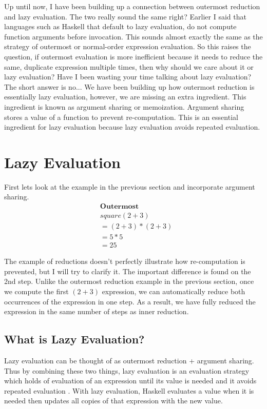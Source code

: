 \documentclass{article}
\begin{document}
\medskip\noindent
Up until now, I have been building up a connection between outermost reduction and lazy evaluation. The two really sound the same right? Earlier I said that languages such as Haskell that default to lazy evaluation, do not compute function arguments before invocation. This sounds almost exactly the same as the strategy of outermost or normal-order expression evaluation. So this raises the question, if outermost evaluation is more inefficient because it needs to reduce the same, duplicate expression multiple times, then why should we care about it or lazy evaluation? Have I been wasting your time talking about lazy evaluation? The short answer is no... We have been building up how outermost reduction is essentially lazy evaluation, however, we are missing an extra ingredient. This ingredient is known as argument sharing or memoization. Argument sharing stores a value of a function to prevent re-computation. This is an essential ingredient for lazy evaluation because lazy evaluation avoids repeated evaluation. 



\section{Lazy Evaluation}

First lets look at the example in the previous section and incorporate argument sharing. \noindent\begin{align*}
&\textbf{Outermost}  \\
&square (2+3)  \\
&=(2+3)*(2+3) \\
&=5 * 5   \\
&=25   
\end{align*}

\medskip\noindent
The example of reductions doesn't perfectly illustrate how re-computation is prevented, but I will try to clarify it. The important difference is found on the 2nd step. Unlike the outermost reduction example in the previous section, once we compute the first $(2+3)$ expression, we can automatically reduce both occurrences of the expression in one step. As a result, we have fully reduced the expression in the same number of steps as inner reduction.

\subsection{What is Lazy Evaluation?}

\medskip\noindent
Lazy evaluation can be thought of as outermost reduction + argument sharing. Thus by combining these two things, lazy evaluation is an evaluation strategy which holds of evaluation of an expression until its value is needed and it avoids repeated evaluation \cite{TP}. With lazy evaluation, Haskell evaluates a value when it is needed then updates all copies of that expression with the new value. 
\end{document}
